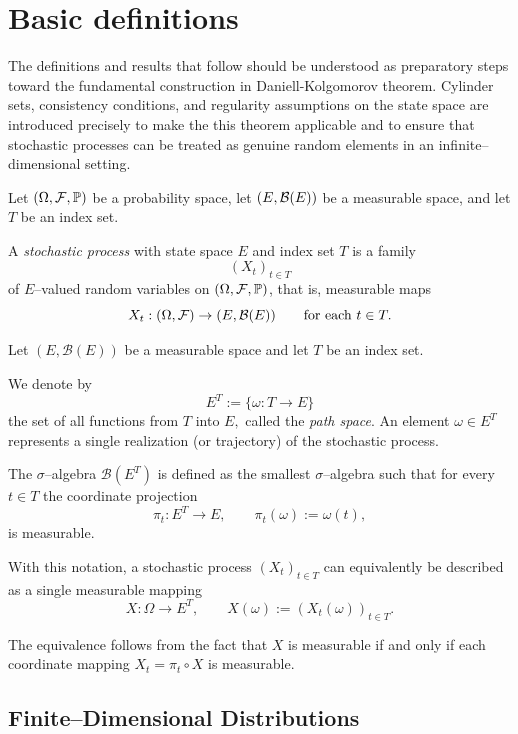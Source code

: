 \section{Basic definitions}

The definitions and results that follow should be understood as preparatory
steps toward the fundamental construction in Daniell-Kolgomorov theorem. Cylinder sets, consistency conditions, and
regularity assumptions on the state space are introduced precisely to make the
this theorem applicable and to ensure that stochastic processes can be
treated as genuine random elements in an infinite--dimensional setting.

\begin{definition}
Let $(\Omega,\mathcal{F},\mathbb{P})$ be a probability space, let $(E,\mathcal{B}(E))$ be a measurable space,
and let $T$ be an index set.

A \emph{stochastic process} with state space $E$ and index set $T$ is a family
\[
(X_t)_{t\in T}
\]
of $E$--valued random variables on $(\Omega,\mathcal{F},\mathbb{P})$, that is, measurable maps
\[
X_t : (\Omega,\mathcal{F}) \to (E,\mathcal{B}(E)) \qquad \text{for each } t\in T.
\]
\end{definition}

\begin{remark}
Let $(E,\mathcal{B}(E))$ be a measurable space and let $T$ be an index set.

We denote by
\[
E^T := \{ \omega : T \to E \}
\]
the set of all functions from $T$ into $E,$
called the \emph{path space}. An element $\omega \in E^T$ represents a single realization
(or trajectory) of the stochastic process.

The $\sigma$--algebra $\mathcal{B}(E^T)$ is defined as the smallest
$\sigma$--algebra such that for every $t \in T$ the coordinate projection
\[
\pi_t : E^T \to E, \qquad \pi_t(\omega) := \omega(t),
\]
is measurable.

With this notation, a stochastic process $(X_t)_{t \in T}$ can equivalently be described
as a single measurable mapping
\[
X : \Omega \to E^T,
\qquad
X(\omega) := (X_t(\omega))_{t \in T}.
\]

The equivalence follows from the fact that $X$ is measurable if and only if each
coordinate mapping $X_t = \pi_t \circ X$ is measurable.
\end{remark}


\subsection{Finite--Dimensional Distributions}

